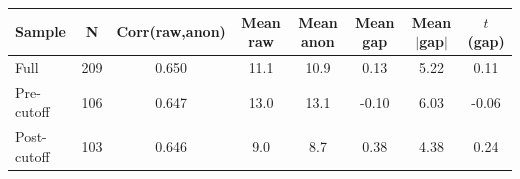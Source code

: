 \begin{tabular}{lccccccc}
\toprule
Sample & N & Corr(raw,anon) & Mean raw & Mean anon & Mean gap & Mean $|$gap$|$ & $t$(gap) \\
\midrule
Full & 209 & 0.650 & 11.1 & 10.9 & 0.13 & 5.22 & 0.11 \\
Pre-cutoff & 106 & 0.647 & 13.0 & 13.1 & -0.10 & 6.03 & -0.06 \\
Post-cutoff & 103 & 0.646 & 9.0 & 8.7 & 0.38 & 4.38 & 0.24 \\
\bottomrule
\end{tabular}